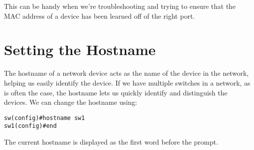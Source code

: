 \noindent
This can be handy when we're troubleshooting and trying to ensure that the MAC address of a device has been learned off of the right port. 

\section{Setting the Hostname}
The hostname of a network device acts as the name of the device in the network, helping us easily identify the device. If we have multiple switches in a network, as is often the case, the hostname lets us quickly identify and distinguish the devices. We can change the hostname using: 

\vspace{-15pt}
\begin{verbatim}
sw(config)#hostname sw1
sw1(config)#end
\end{verbatim}
\vspace{-10pt}

\noindent
The current hostname is displayed as the first word before the prompt. 